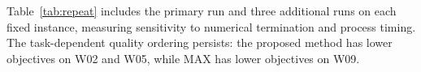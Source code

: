 Table~\ref{tab:repeat} includes the primary run and three additional runs on each fixed instance, measuring sensitivity to numerical termination and process timing. The task-dependent quality ordering persists: the proposed method has lower objectives on W02 and W05, while MAX has lower objectives on W09.
